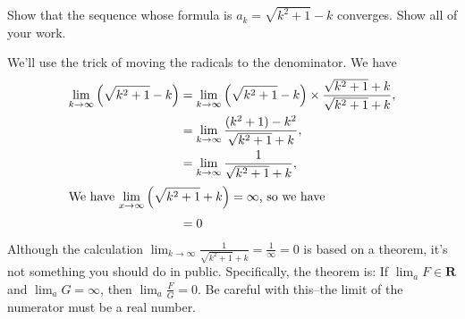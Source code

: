 \documentclass[12pt,fleqn]{exam}
\newcommand{\reals}{\mathbf{R}}
\begin{document}
\begin{questions}
  \question [2] Show that the sequence whose formula is 
  $a_k = \sqrt{k^2+1} - k$ converges. Show all of your work.
  \begin{solution}%
  We'll use the trick of moving the radicals to the denominator. We have
  \begin{align*}
  \lim_{k \to \infty} \left(\sqrt{k^2+1} - k \right)  &= \lim_{k \to \infty} \left(\sqrt{k^2+1} - k \right)   \times \frac{\sqrt{k^2+1}  + k}{\sqrt{k^2+1}  + k}, \\
                                                                 &= \lim_{k \to \infty} \frac{(k^2+1) - k^2}{\sqrt{k^2+1}  + k}, \\
                                                                 &=  \lim_{k \to \infty} \frac{1}{\sqrt{k^2+1}  + k}, \\
      \intertext{We have $\displaystyle \lim_{x \to \infty}   \left( \sqrt{k^2+1}  + k \right) = \infty$, so we have}                                                        
                                                                 &=  0
  \end{align*}
  Although the calculation $\displaystyle \lim_{k \to \infty} \frac{1}{\sqrt{k^2+1}  + k} = \frac{1}{\infty} = 0$ is based on a theorem, it's not   
  something you should do in public. Specifically, the theorem is: 
  If $\displaystyle \lim_a   F \in \reals$ and $\displaystyle \lim_a G = \infty$,
  then $\displaystyle \lim_a \frac{F}{G} = 0$. Be careful with this--the limit of the numerator must be a real number.
  \end{solution}


\end{questions}
\end{document}
